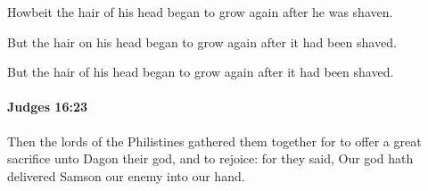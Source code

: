 			\begin{versebox}
					\item[BHS] 
					\item[ASV] Howbeit the hair of his head began to grow again after he was shaven.
					\item[NIV] But the hair on his head began to grow again after it had been shaved.
					\item[NRSV] But the hair of his head began to grow again after it had been shaved.
			\end{versebox}

		\paragraph{Judges 16:23} %
			\label{JUDGES-16-23}

			Then the lords of the Philistines gathered them together for to offer a great sacrifice unto Dagon their god, and to rejoice: for they said, Our god hath delivered Samson our enemy into our hand.

